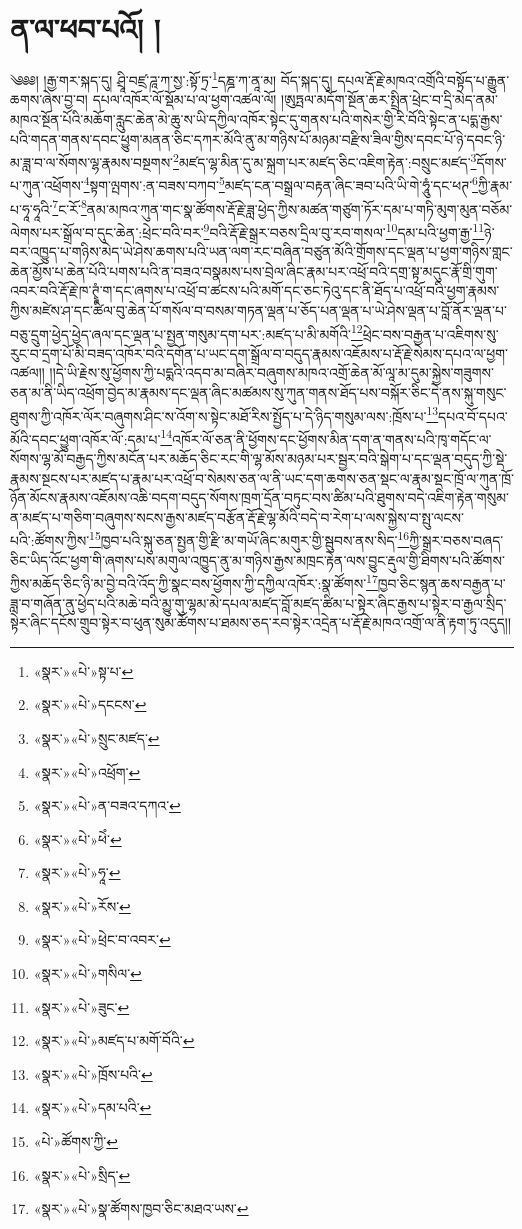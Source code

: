 \chapter{ན་ལ་ཕབ་པའོ། ། }༄༅༅། །རྒྱ་གར་སྐད་དུ། ཤྲཱི་བཛྲ་ཌཱ་ཀ་སྱ་:སྟོ་ཏྲ་\footnote{«སྣར་»«པེ་»སྟ་པ་}དཎྜ་ཀ་ནཱ་མ། བོད་སྐད་དུ། དཔལ་རྡོ་རྗེ་མཁའ་འགྲོའི་བསྟོད་པ་རྒྱུན་ཆགས་ཞེས་བྱ་བ། དཔལ་འཁོར་ལོ་སྡོམ་པ་ལ་ཕྱག་འཚལ་ལོ། །ཨུཏྤལ་མདོག་སྔོན་ཆར་སྤྲིན་ཕྲེང་བ་དྲི་མེད་ནམ་མཁའ་སྔོན་པོའི་མཆོག་རླུང་ཆེན་མེ་ཆུ་ས་ཡི་དཀྱིལ་འཁོར་སྟེང་དུ་གནས་པའི་གསེར་གྱི་རི་བོའི་སྟེང་ན་པདྨ་རྒྱས་པའི་གདན་གནས་དབང་ཕྱུག་མནན་ཅིང་དཀར་མོའི་ནུ་མ་གཉིས་པོ་མཉམ་བརྫིས་ཟིལ་གྱིས་དབང་པོ་ཉེ་དབང་ཉི་མ་ཟླ་བ་ལ་སོགས་ལྷ་རྣམས་བསྔགས་\footnote{«སྣར་»«པེ་»དངངས་}མཛད་ལྷ་མིན་དུ་མ་སྐྲག་པར་མཛད་ཅིང་འཇིག་རྟེན་:བསྲུང་མཛད་\footnote{«སྣར་»«པེ་»སྲུང་མཛད་}དོགས་པ་ཀུན་འཕྲོགས་\footnote{«སྣར་»«པེ་»འཕྲོག་}སྟག་ལྤགས་:ན་བཟས་བཀབ་\footnote{«སྣར་»«པེ་»ན་བཟའ་དཀའ་}མཛད་ངན་བསྒྲལ་བརྟན་ཞིང་ཟབ་པའི་ཡི་གེ་ཧཱུཾ་དང་ཕཊ་\footnote{«སྣར་»«པེ་»ཕེཾ་}ཀྱི་རྣམ་པ་ཧཱ་ཧཱའི་\footnote{«སྣར་»«པེ་»ཧཱ་}ང་རོ་\footnote{«སྣར་»«པེ་»རོས་}ནམ་མཁའ་ཀུན་གང་སྣ་ཚོགས་རྡོ་རྗེ་ཟླ་ཕྱེད་ཀྱིས་མཚན་གཙུག་ཏོར་དམ་པ་གཏི་མུག་མུན་བཅོམ་ལེགས་པར་སྒྲོལ་བ་དུང་ཆེན་:ཕྲེང་བའི་བར་\footnote{«སྣར་»«པེ་»ཕྲེང་བ་འབར་}བའི་རྡོ་རྗེ་སྒྲར་བཅས་དྲིལ་བུ་རབ་གསལ་\footnote{«སྣར་»«པེ་»གསིལ་}དམ་པའི་ཕྱག་རྒྱ་\footnote{«སྣར་»«པེ་»ཟུང་}ཉེ་བར་འཁྱུད་པ་གཉིས་མེད་ཡེ་ཤེས་ཆགས་པའི་ཡན་ལག་རང་བཞིན་བཙུན་མོའི་གྲོགས་དང་ལྡན་པ་ཕྱག་གཉིས་གླང་ཆེན་མྱོས་པ་ཆེན་པོའི་པགས་པའི་ན་བཟའ་བསྣམས་པས་བྲེལ་ཞིང་རྣམ་པར་འཕྲོ་བའི་དགྲ་སྟ་མདུང་རྣོ་གྲི་གུག་འབར་བའི་རྡོ་རྗེ་ཁ་ཊྭཱཾ་ག་དང་ཞགས་པ་འཕྲོ་བ་ཚངས་པའི་མགོ་དང་ཅང་ཏེའུ་དང་ནི་ཐོད་པ་འཕྲོ་བའི་ཕྱག་རྣམས་ཀྱིས་མཛེས་ཤ་དང་ཚིལ་བུ་ཆེན་པོ་གསོལ་བ་བསམ་གཏན་ལྡན་པ་ཅོད་པན་ལྡན་པ་ཡེ་ཤེས་ལྡན་པ་བློ་ནོར་ལྡན་པ་བཅུ་དྲུག་ཕྱེད་ཕྱེད་ཞལ་དང་ལྡན་པ་སྤྱན་གསུམ་དག་པར་:མཛད་པ་མི་མགོའི་\footnote{«སྣར་»«པེ་»མཛད་པ་མགོ་བོའི་}ཕྲེང་བས་བརྒྱན་པ་འཇིགས་སུ་རུང་བ་དྲག་པོ་མི་བཟད་འཁོར་བའི་དགོན་པ་ཡང་དག་སྒྲོལ་བ་བདུད་རྣམས་འཇོམས་པ་རྡོ་རྗེ་སེམས་དཔའ་ལ་ཕྱག་འཚལ།། །།དེ་ཡི་རྗེས་སུ་ཕྱོགས་ཀྱི་པདྨའི་འདབ་མ་བཞིར་བཞུགས་མཁའ་འགྲོ་ཆེན་མོ་ལཱ་མ་དུམ་སྐྱེས་གཟུགས་ཅན་མ་ནི་ཡིད་འཕྲོག་བྱེད་མ་རྣམས་དང་ལྡན་ཞིང་མཚམས་སུ་ཀུན་གནས་ཐོད་པས་བསྐོར་ཅིང་དེ་ནས་སྐུ་གསུང་ཐུགས་ཀྱི་འཁོར་ལོར་བཞུགས་ཤིང་ས་འོག་ས་སྟེང་མཐོ་རིས་སྤྱོད་པ་དེ་ཉིད་གསུམ་ལས་:ཁྲོས་པ་\footnote{«སྣར་»«པེ་»ཁྲོས་པའི་}དཔའ་བོ་དཔའ་མོའི་དབང་ཕྱུག་འཁོར་ལོ་:དམ་པ་\footnote{«སྣར་»«པེ་»དམ་པའི་}འཁོར་ལོ་ཅན་ནི་ཕྱོགས་དང་ཕྱོགས་མིན་དག་ན་གནས་པའི་ཁྭ་གདོང་ལ་སོགས་ལྷ་མོ་བརྒྱད་ཀྱིས་མངོན་པར་མཆོད་ཅིང་རང་གི་ལྷ་མོས་མཉམ་པར་སྦྱར་བའི་སྒེག་པ་དང་ལྡན་བདུད་ཀྱི་སྡེ་རྣམས་སྔངས་པར་མཛད་པ་རྣམ་པར་འཕྲོ་བ་སེམས་ཅན་ལ་ནི་ཡང་དག་ཆགས་ཅན་སྡང་ལ་རྣམ་སྡང་ཁྲོ་ལ་ཀུན་ཁྲོ་ཉོན་མོངས་རྣམས་འཇོམས་འཆི་བདག་བདུད་སོགས་ཁྲག་དྲོན་བཏུང་བས་ཚིམ་པའི་ཐུགས་བདེ་འཇིག་རྟེན་གསུམ་ན་མཛད་པ་གཅིག་བཞུགས་སངས་རྒྱས་མཛད་བརྩོན་རྡོ་རྗེ་ལྷ་མོའི་བདེ་བ་རེག་པ་ལས་སྐྱེས་བ་སྤུ་ལངས་པའི་:ཚོགས་ཀྱིས་\footnote{«པེ་»ཚོགས་ཀྱི་}ཁྱབ་པའི་སྐུ་ཅན་སྤྱན་གྱི་རྫི་མ་གཡོ་ཞིང་མགུར་གྱི་སྦུབས་ནས་སིད་\footnote{«སྣར་»«པེ་»སྲིད་}ཀྱི་སྒྲར་བཅས་བཞད་ཅིང་ཡིད་འོང་ཕྱག་གི་ཞགས་པས་མགུལ་འཁྱུད་ནུ་མ་གཉིས་རྒྱས་མཁྲང་རྟེན་ལས་བྱུང་རྡུལ་གྱི་ཐིགས་པའི་ཚོགས་ཀྱིས་མཆོད་ཅིང་ཉི་མ་བྱེ་བའི་འོད་ཀྱི་སྣང་བས་ཕྱོགས་ཀྱི་དཀྱིལ་འཁོར་:སྣ་ཚོགས་\footnote{«སྣར་»«པེ་»སྣ་ཚོགས་ཁྱབ་ཅིང་མཐའ་ཡས་}ཁྱབ་ཅིང་སྙན་ཆས་བརྒྱན་པ་ཟླ་བ་གཞོན་ནུ་ཕྱེད་པའི་མཆེ་བའི་མྱུ་གུ་ལྷམ་མེ་དཔལ་མཛད་བློ་མཛད་ཚིམ་པ་སྟེར་ཞིང་རྒྱས་པ་སྟེར་བ་རྒྱལ་སྲིད་སྟེར་ཞིང་དངོས་གྲུབ་སྟེར་བ་ཕུན་སུམ་ཚོགས་པ་ཐམས་ཅད་རབ་སྟེར་འདྲེན་པ་རྡོ་རྗེ་མཁའ་འགྲོ་ལ་ནི་རྟག་ཏུ་འདུད།། 